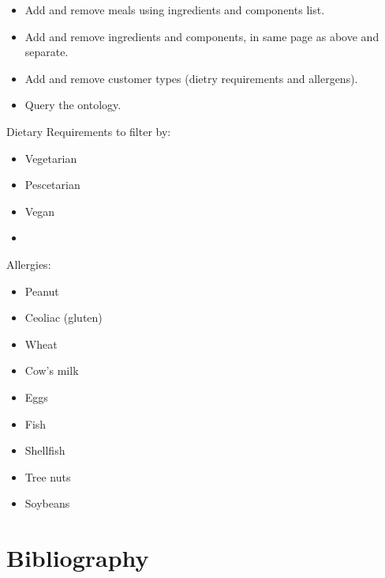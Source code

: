 \documentclass{article}
\begin{document}
\begin{itemize}
\item Add and remove meals using ingredients and components list.
\item Add and remove ingredients and components, in same page as above and separate.
\item Add and remove customer types (dietry requirements and allergens).
\item Query the ontology.
\end{itemize}

Dietary Requirements to filter by:

\begin{itemize}
\item Vegetarian
\item Pescetarian
\item Vegan
\item
\end{itemize}

Allergies\cite{burks2001food}:

\begin{itemize}
\item Peanut
\item Ceoliac (gluten)
\item Wheat
\item Cow's milk
\item Eggs
\item Fish
\item Shellfish
\item Tree nuts
\item Soybeans
\end{itemize}


\section{Bibliography}


\end{document}
